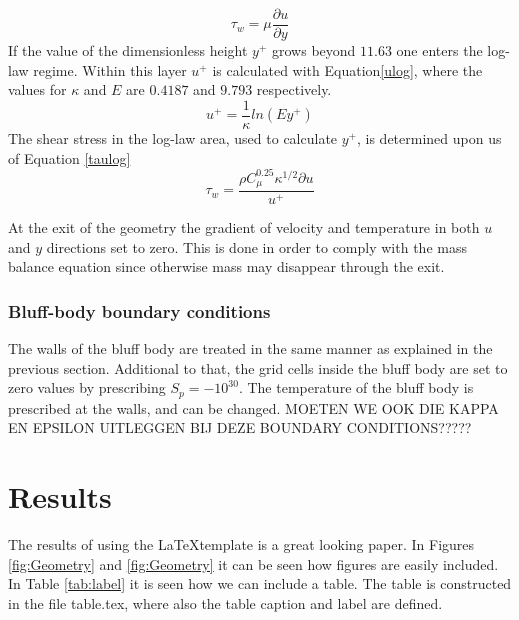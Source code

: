 \documentclass{CFD2017}
\begin{document}
\begin{equation}
\label{subtau}
\tau_w = \mu \frac{\partial u}{\partial y}
\end{equation}
If the value of the dimensionless height $y^+$ grows beyond $11.63$ one enters the log-law regime. Within this layer $u^+$ is calculated with Equation\ref{ulog}, where the values for $\kappa$ and $E$ are $0.4187$ and $9.793$ respectively.
\begin{equation}
\label{ulog}
u^+=\frac{1}{\kappa}ln(Ey^+)
\end{equation}
The shear stress in the log-law area, used to calculate $y^+$, is determined upon us of Equation \ref{taulog}
\begin{equation}
\label{taulog}
\tau_w = \frac{\rho C_{\mu}^{0.25}\kappa^{1/2}\partial u}{u^+}
\end{equation}


 At the exit of the geometry the gradient of velocity and temperature in both $u$ and $y$ directions set to zero. This is done in order to comply with the mass balance equation since otherwise mass may disappear through the exit.\\

\subsubsection{Bluff-body boundary conditions} \label{bluffBC}
The walls of the bluff body are treated in the same manner as explained in the previous section. Additional to that, the grid cells inside the bluff body are set to zero values by prescribing $S_p=-10^{30}$. The temperature of the bluff body is prescribed at the walls, and can be changed. MOETEN WE OOK DIE KAPPA EN EPSILON UITLEGGEN BIJ DEZE BOUNDARY CONDITIONS?????

 
\section{Results}
The results of using the \LaTeX template is a great looking paper.
In Figures \ref{fig:Geometry} and \ref{fig:Geometry} it can be seen how figures are easily included.
In Table \ref{tab:label} it is seen how we can include a table.
The table is constructed in the file table.tex, where also the table caption and label are defined.

\newpage
{}
\end{document}
